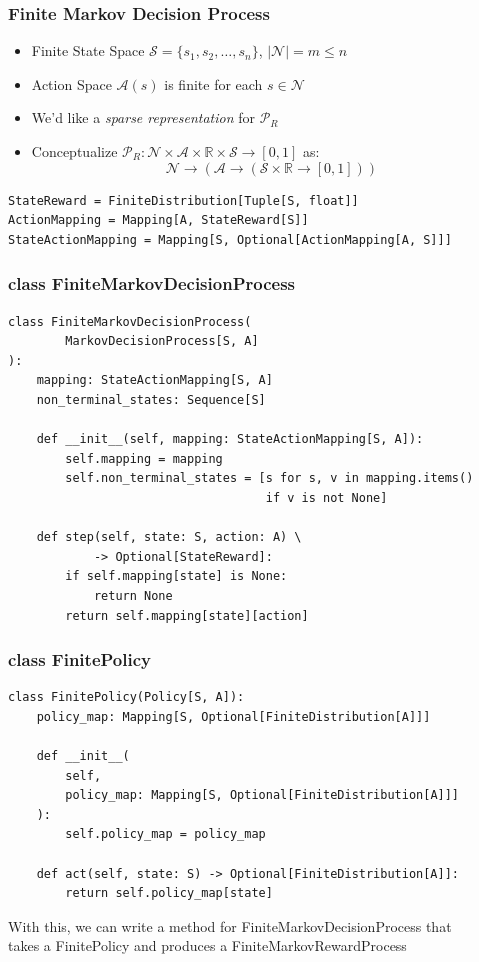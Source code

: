 \documentclass[handout]{beamer}
\begin{document}
\begin{frame}[fragile]
\frametitle{Finite Markov Decision Process}
\pause
\begin{itemize}[<+->]
\item Finite State Space $\mathcal{S} = \{s_1, s_2, \ldots, s_n\}$, $|\mathcal{N}| = m\leq n$
\item Action Space $\mathcal{A}(s)$ is finite for each $s \in \mathcal{N}$
\item We'd like a {\em sparse representation} for $\mathcal{P}_R$
\item Conceptualize $\mathcal{P}_R : \mathcal{N} \times \mathcal{A} \times \mathbb{R} \times \mathcal{S} \rightarrow [0, 1]$ as:
$$\mathcal{N} \rightarrow (\mathcal{A} \rightarrow (\mathcal{S} \times \mathbb{R} \rightarrow [0, 1]))$$
\end{itemize}
\begin{lstlisting}
StateReward = FiniteDistribution[Tuple[S, float]]
ActionMapping = Mapping[A, StateReward[S]]
StateActionMapping = Mapping[S, Optional[ActionMapping[A, S]]]
\end{lstlisting}
\end{frame}


\begin{frame}[fragile]
\frametitle{class FiniteMarkovDecisionProcess}
\pause
\begin{lstlisting}
class FiniteMarkovDecisionProcess(
        MarkovDecisionProcess[S, A]
):
    mapping: StateActionMapping[S, A]
    non_terminal_states: Sequence[S]

    def __init__(self, mapping: StateActionMapping[S, A]):
        self.mapping = mapping
        self.non_terminal_states = [s for s, v in mapping.items()
                                    if v is not None]

    def step(self, state: S, action: A) \
            -> Optional[StateReward]:
        if self.mapping[state] is None:
            return None
        return self.mapping[state][action]                                
\end{lstlisting}                                    
\end{frame}

\begin{frame}[fragile]
\frametitle{class FinitePolicy}
\pause
\begin{lstlisting}
class FinitePolicy(Policy[S, A]):
    policy_map: Mapping[S, Optional[FiniteDistribution[A]]]

    def __init__(
        self,
        policy_map: Mapping[S, Optional[FiniteDistribution[A]]]
    ):
        self.policy_map = policy_map

    def act(self, state: S) -> Optional[FiniteDistribution[A]]:
        return self.policy_map[state]                           
\end{lstlisting}

With this, we can write a method for FiniteMarkovDecisionProcess that \\
takes a FinitePolicy and produces a FiniteMarkovRewardProcess                                 
\end{frame}
\end{document}

